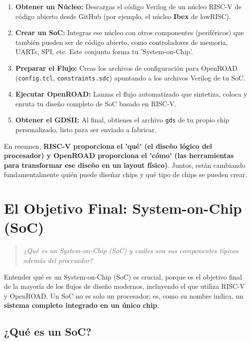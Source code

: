 \documentclass[12pt,a4paper]{article}
\newenvironment{pregunta}
  {\begin{leftbar}\begin{quote}\itshape}
  {\end{quote}\end{leftbar}}
\begin{document}
\begin{enumerate}
    \item \textbf{Obtener un Núcleo:} Descargas el código Verilog de un núcleo RISC-V de código abierto desde GitHub (por ejemplo, el núcleo \textbf{Ibex} de lowRISC).
    \item \textbf{Crear un SoC:} Integras ese núcleo con otros componentes (periféricos) que también pueden ser de código abierto, como controladores de memoria, UARTs, SPI, etc. Este conjunto forma tu 'System-on-Chip'.
    \item \textbf{Preparar el Flujo:} Creas los archivos de configuración para OpenROAD (\texttt{config.tcl}, \texttt{constraints.sdc}) apuntando a los archivos Verilog de tu SoC.
    \item \textbf{Ejecutar OpenROAD:} Lanzas el flujo automatizado que sintetiza, coloca y enruta tu diseño completo de SoC basado en RISC-V.
    \item \textbf{Obtener el GDSII:} Al final, obtienes el archivo \texttt{gds} de tu propio chip personalizado, listo para ser enviado a fabricar.
\end{enumerate}

En resumen, \textbf{RISC-V proporciona el 'qué' (el diseño lógico del procesador) y OpenROAD proporciona el 'cómo' (las herramientas para transformar ese diseño en un layout físico)}. Juntos, están cambiando fundamentalmente quién puede diseñar chips y qué tipo de chips se pueden crear.

\newpage
\section{El Objetivo Final: System-on-Chip (SoC)}

\begin{pregunta}
¿Qué es un System-on-Chip (SoC) y cuáles son sus componentes típicos además del procesador?
\end{pregunta}

Entender qué es un System-on-Chip (SoC) es crucial, porque es el objetivo final de la mayoría de los flujos de diseño modernos, incluyendo el que utiliza RISC-V y OpenROAD. Un SoC no es solo un procesador; es, como su nombre indica, un \textbf{sistema completo integrado en un único chip}.

\subsection{¿Qué es un SoC?}
\end{document}
